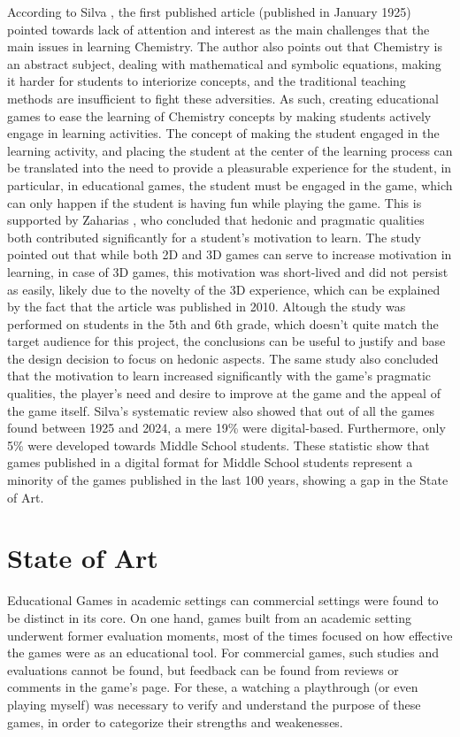 According to Silva \cite{daSilva2025}, the first published article (published in January 1925) pointed towards lack of attention and interest as the main challenges that the main issues in learning Chemistry. The author also points out that Chemistry is an abstract subject, dealing with mathematical and symbolic equations, making it harder for students to interiorize concepts, and the traditional teaching methods are insufficient to fight these adversities. As such, creating educational games to ease the learning of Chemistry concepts by making students actively engage in learning activities. \newline
The concept of making the student engaged in the learning activity, and placing the student at the center of the learning process can be translated into the need to provide a pleasurable experience for the student, in particular, in educational games, the student must be engaged in the game, which can only happen if the student is having fun while playing the game. This is supported by Zaharias \cite{Zaharias2010}, who concluded that hedonic and pragmatic qualities both contributed significantly for a student's motivation to learn.\newline
The study pointed out that while both 2D and 3D games can serve to increase motivation in learning, in case of 3D games, this motivation was short-lived and did not persist as easily, likely due to the novelty of the 3D experience, which can be explained by the fact that the article was published in 2010. Altough the study was performed on students in the 5th and 6th grade, which doesn't quite match the target audience for this project, the conclusions can be useful to justify and base the design decision to focus on hedonic aspects.
The same study also concluded that the motivation to learn increased significantly with the game's pragmatic qualities, the player's need and desire to improve at the game and the appeal of the game itself.\newline
Silva's systematic review \cite{daSilva2025} also showed that out of all the games found between 1925 and 2024, a mere 19\% were digital-based. Furthermore, only 5\% were developed towards Middle School students. These statistic show that games published in a digital format for Middle School students represent a minority of the games published in the last 100 years, showing a gap in the State of Art.



\section{State of Art}
Educational Games in academic settings can commercial settings were found to be distinct in its core.
On one hand, games built from an academic setting underwent former evaluation moments, most of the times focused on how effective the games were as an educational tool.
For commercial games, such studies and evaluations cannot be found, but feedback can be found from reviews or comments in the game's page.
For these, a watching a playthrough (or even playing myself) was necessary to verify and understand the purpose of these games, in order to categorize their strengths and weakenesses. \newline 

